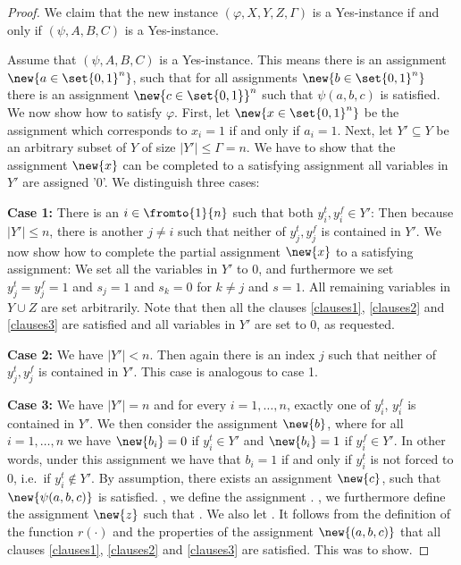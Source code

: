 \documentclass[a4paper,abstracton]{scrartcl}
\begin{document}
\begin{proof}
We claim that the new instance $(\varphi,X,Y,Z, \Gamma)$ is a Yes-instance if and only if $(\psi,A,B,C)$ is a Yes-instance.

Assume that $(\psi,A,B,C)$ is a Yes-instance. This means there is an assignment $\new{a \in \set{0,1}^n}$, such that for all assignments $\new{b \in \set{0,1}^n}$ there is an assignment $\new{c \in \set{0,1}}^n$ such that $\psi(a,b,c)$ is satisfied. 
We now show how to satisfy $\varphi$. 
First, let $\new{x \in \set{0,1}^n}$ be the assignment which corresponds to  $x_i=1$ if and only if $a_i=1$. 
Next, let $Y' \subseteq Y$ be an arbitrary subset of $Y$ of size $|Y'| \leq \Gamma = n$. 
We have to show that the assignment $\new{x}$ can be completed to a satisfying assignment  all variables in $Y'$ are assigned '0'.  We distinguish three cases:

\textbf{Case 1:} There is an $i \in \fromto{1}{n}$ such that both $y_i^t,y_i^f \in Y'$: Then because $|Y'| \leq n$, there is another $j \neq i$ such that neither of $y^t_j, y^f_j$ is contained in $Y'$. 
We now show how to complete the partial assignment $\new{x}$ to a satisfying assignment: We set all the variables in $Y'$ to 0, and furthermore we set $y^t_j=y^f_j=1$ and $s_j=1$ and $s_k=0$ for $k \neq j$ and $s=1$. 
All remaining variables in $Y \cup Z$ are set arbitrarily. Note that then all the clauses \eqref{clauses1}, \eqref{clauses2} and \eqref{clauses3} are satisfied and all variables in $Y'$ are set to 0, as requested.

\textbf{Case 2:} We have $|Y'| < n$. Then again there is an index $j$ such that neither of $y^t_j, y^f_j$ is contained in $Y'$. This case is analogous to case 1.

\textbf{Case 3:} We have $|Y'| = n$ and for every $i=1,\dots,n$, exactly one of $y_i^t$, $y^f_i$ is contained in $Y'$. 
We then consider the assignment $\new{b}$, where for all $i=1,\dots,n$ we have $\new{b_i} = 0$ if $y_i^t \in Y'$ and $\new{b_i} = 1$ if $y_i^f \in Y'$. 
In other words, under this assignment we have that $b_i = 1$ if and only if $y^t_i$ is not forced to 0, i.e.\ if $y^t_i \not\in Y'$. 
By assumption, there exists an assignment $\new{c}$, such that $\new{\psi(a,b,c)}$ is satisfied. 
, we define the assignment . 
, we furthermore define the assignment $\new{z}$ such that . 
We also let . 
It follows from the definition of the function $r(\cdot)$ and the properties of the assignment $\new{(a,b,c)}$ that all clauses \eqref{clauses1}, \eqref{clauses2} and \eqref{clauses3} are satisfied. This was to show.


\end{proof}
\end{document}
